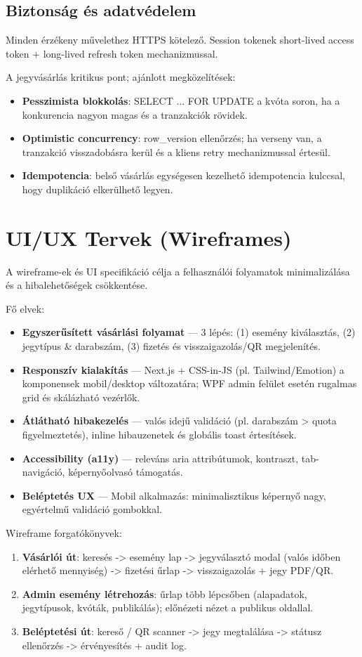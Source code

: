 \documentclass[colorlinks]{docs}
\theoremstyle{definition}
\theoremstyle{remark}
\begin{document}
\subsection{Biztonság és adatvédelem}
Minden érzékeny művelethez HTTPS kötelező. Session tokenek short-lived access token + long-lived refresh token mechanizmussal.

A jegyvásárlás kritikus pont; ajánlott megközelítések:
\begin{itemize}
    \item \textbf{Pesszimista blokkolás}: SELECT ... FOR UPDATE a kvóta soron, ha a konkurencia nagyon magas és a tranzakciók rövidek.
    \item \textbf{Optimistic concurrency}: row\_version ellenőrzés; ha verseny van, a tranzakció visszadobásra kerül és a kliens retry mechanizmussal értesül.
    \item \textbf{Idempotencia}: belső vásárlás egységesen kezelhető idempotencia kulccsal, hogy duplikáció elkerülhető legyen.
\end{itemize}

\section{UI/UX Tervek (Wireframes)}
A wireframe-ek és UI specifikáció célja a felhasználói folyamatok minimalizálása és a hibalehetőségek csökkentése.

Fő elvek:
\begin{itemize}
    \item \textbf{Egyszerűsített vásárlási folyamat} — 3 lépés: (1) esemény kiválasztás, (2) jegytípus \& darabszám, (3) fizetés és visszaigazolás/QR megjelenítés.
    \item \textbf{Responszív kialakítás} — Next.js + CSS-in-JS (pl. Tailwind/Emotion) a komponensek mobil/desktop változatára; WPF admin felület esetén rugalmas grid és skálázható vezérlők.
    \item \textbf{Átlátható hibakezelés} — valós idejű validáció (pl. darabszám > quota figyelmeztetés), inline hibauzenetek és globális toast értesítések.
    \item \textbf{Accessibility (a11y)} — releváns aria attribútumok, kontraszt, tab-navigáció, képernyőolvasó támogatás.
    \item \textbf{Beléptetés UX} — Mobil alkalmazás: minimalisztikus képernyő nagy, egyértelmű validáció gombokkal.
\end{itemize}

Wireframe forgatókönyvek:
\begin{enumerate}
    \item \textbf{Vásárlói út}: keresés -> esemény lap -> jegyválasztó modal (valós időben elérhető mennyiség) -> fizetési űrlap -> visszaigazolás + jegy PDF/QR.
    \item \textbf{Admin esemény létrehozás}: űrlap több lépcsőben (alapadatok, jegytípusok, kvóták, publikálás); előnézeti nézet a publikus oldallal.
    \item \textbf{Beléptetési út}: kereső / QR scanner -> jegy megtalálása -> státusz ellenőrzés -> érvényesítés + audit log.
\end{enumerate}
\end{document}
